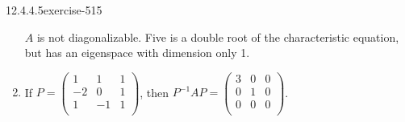 \documentclass[twoside,10pt,]{book}
\numberwithin{equation}{section}
\begin{document}
\begin{divisionsolution}{12.4.4.5}{}{exercise-515}
\begin{multicols}{2}
\begin{enumerate}[label=(\alph*)]
\(A\) is not diagonalizable. Five is a double root of the characteristic equation, but has an eigenspace with dimension only 1.%
\item\hypertarget{li-2123}{}\hypertarget{p-4646}{}%
If  \(P=\left(
\begin{array}{ccc}
1 & 1 & 1 \\
-2 & 0 & 1 \\
1 & -1 & 1 \\
\end{array}
\right)\), then \(P^{-1}A P=\left(
\begin{array}{ccc}
3 & 0 & 0 \\
0 & 1 & 0 \\
0 & 0 & 0 \\
\end{array}
\right)\).%
\end{enumerate}
\end{multicols}
%
\end{divisionsolution}%
\end{document}
